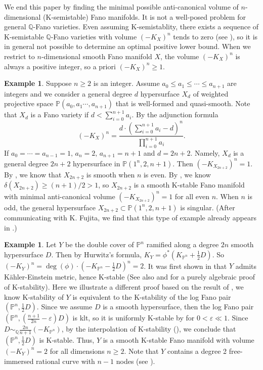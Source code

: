 \documentclass[12pt]{amsart}
\theoremstyle{definition}
\newtheorem{ex}[thm]{Example}
\newcommand{\IP}{{\mathbb P}}
\newcommand{\IQ}{{\mathbb Q}}
\newcommand{\lee}{\leqslant}
\newcommand{\gee}{\geqslant}
\begin{document}
We end this paper by finding the minimal possible anti-canonical volume of $n$-dimensional (K-semistable) Fano manifolds. It is not a well-posed problem for general $\IQ$-Fano varieties. Even assuming K-semistablity, there exists a sequence of K-semistable $\IQ$-Fano varieties with volume $(-K_X)^n$ tends to zero (see \cite[Example 1.4(2)]{Jia17}), so it is in general not possible to determine an optimal positive lower bound. When we restrict to $n$-dimensional smooth Fano manifold $X$, the volume $(-K_X)^n$ is always a positive integer, so a priori $(-K_X)^n\gee 1$. 
\begin{ex}\label{ex:V1even}
    Suppose $n\gee 2$ is an integer. Assume $a_0\lee a_1\lee\cdots \lee a_{n+1}$ are integers and we consider a general degree $d$ hypersurface $X_d$ of weighted projective space $\IP(a_0,a_1\cdots,a_{n+1})$ that is well-formed and quasi-smooth. Note that $X_d$ is a Fano variety if $d<\sum_{i=0}^{n+1}a_i$. By the adjunction formula
    $$
    (-K_X)^n = \frac{d\cdot(\sum_{i=0}^{n+1} a_i -d)^n}{\prod_{i=0}^{n+1}a_i}. 
    $$
    If $a_0=\cdots=a_{n-1}=1,\, a_n =2, \,a_{n+1}=n+1$ and $d= 2n+2$. Namely, $X_d$ is a general degree $2n+2$ hypersurface in $\IP(1^n,2,n+1)$. Then $(-K_{X_{2n+2}})^n = 1$.
    By \cite[Thm 8.1]{IF00}, we know that $X_{2n+2}$ is smooth when $n$ is even. By 
    \cite[Thm 1.3]{ST24}, 
    we know $\delta(X_{2n+2})\gee (n+1)/2> 1$, so $X_{2n+2}$ is a smooth K-stable Fano manifold with minimal anti-canonical volume $(-K_{X_{2n+2}})^n=1$ for all even $n$. When $n$ is odd, the general hypersurface $X_{2n+2}\subset \IP(1^n,2,n+1)$ is singular. (After communicating with K. Fujita, we find that this type of example already appears in \cite[Theorem 5.22]{KSC04}.)
\end{ex}
\begin{ex}\label{ex:V2}
    Let $Y$ be the double cover of $\IP^n$ ramified along a degree $2n$ smooth hypersurface $D$. Then by Hurwitz's formula, $K_Y=\phi^*(K_{\IP^n}+\frac{1}{2}D)$. So $(-K_Y)^n = \deg(\phi)\cdot (-K_{\IP^n}-\frac{1}{2}D)^n=2$. It was first shown in \cite[Theorem 3.2]{AGP06} that $Y$ admits K\"ahler-Einstein metric, hence K-stable (See also \cite{Der16} and \cite[Corollary 4.9(3)]{AZ22} for a purely algebraic proof of K-stability). Here we illustrate a different proof based on the result of \cite{LZ20,Zhu21}, we know K-stability of $Y$ is equivalent to the K-stability of the log Fano pair $(\IP^n,\frac{1}{2}D)$. Since we assume $D$ is a smooth hypersurface, then the log Fano pair $(\IP^n, (\frac{n+1}{2n}-\varepsilon)D)$ is klt, so it is uniformly K-stable by \cite[Theorem 2.10]{ADL21} for $0<\varepsilon\ll1$. Since $D\sim_{\IQ} \frac{2n}{n+1}(-K_{\IP^n})$, by the interpolation of K-stability (\cite[Prop 2.13]{ADL19}), we conclude that $(\IP^n,\frac{1}{2}D)$ is K-stable. Thus, $Y$ is a smooth K-stable Fano manifold with volume $(-K_Y)^n = 2$ for all dimensions $n\gee 2$. Note that $Y$ contains a degree 2 free-immersed rational curve with $n-1$ nodes (see \cite[\rm IV.2.12.3]{Kol96}).
\end{ex}
\end{document}
